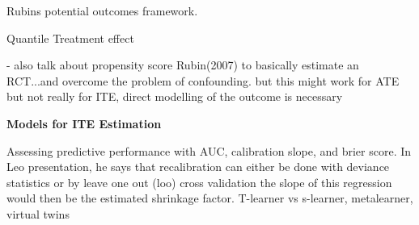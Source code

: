 % 
% 
% 
% 


Rubins potential outcomes framework.

Quantile Treatment effect




- also talk about propensity score Rubin(2007) to basically estimate an RCT...and overcome the problem of confounding. but this might work for ATE but not really for ITE, direct modelling of the outcome is necessary %


\textbf{Models for ITE Estimation}




Assessing predictive performance with AUC, calibration slope, and brier score. In Leo presentation, he says that recalibration can either be done with deviance statistics or by leave one out (loo) cross validation the slope of this regression would then be the estimated shrinkage factor.
T-learner vs s-learner, metalearner, virtual twins

